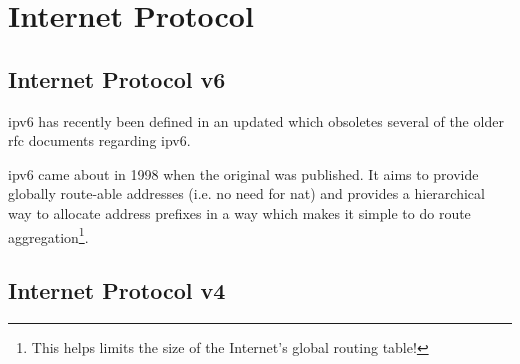 \chapter[IP]{Internet Protocol}

\section[IPv6]{Internet Protocol v6}

\gls{ipv6} has recently been defined in an updated  which obsoletes several of the older \gls{rfc} documents regarding \gls{ipv6}.

\gls{ipv6} came about in 1998 when the original  was published. It aims to provide globally route-able addresses (i.e. no need for \gls{nat}) and provides a hierarchical way to allocate address prefixes in a way which makes it simple to do route aggregation\footnote{This helps limits the size of the Internet's global routing table!}.




\section[IPv4]{Internet Protocol v4}